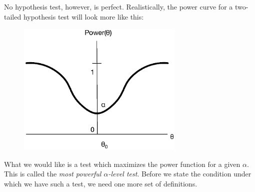 \documentclass[12pt]{article}
\theoremstyle{definition}
\theoremstyle{remark}
\begin{document}
No hypothesis test, however, is perfect. Realistically, the power curve for a two-tailed hypothesis test will look more like this:

\begin{figure}[H]
\centering
\includegraphics[width=8cm]{realpower}
\end{figure}

What we would like is a test which maximizes the power function for a given $\alpha$. This is called the \emph{most powerful $\alpha$-level test}. Before we state the condition under which we have such a test, we need one more set of definitions.
\end{document}
